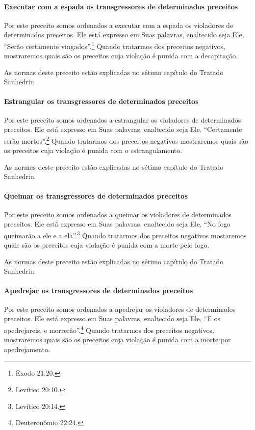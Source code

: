 \begin{multicols}{2}
\paragraph{Executar com a espada os transgressores de determinados preceitos}

Por este preceito somos ordenados a executar com a espada os violadores
de determinados preceitos. Ele está expresso em Suas palavras,
enaltecido seja Ele, ``Serão certamente vingados''.\footnote{Êxodo 21:20.}
Quando tratarmos dos preceitos negativos, mostraremos quais são os
preceitos cuja violação é punida com a decapitação.

As normas deste preceito estão explicadas no sétimo capítulo do Tratado
Sanhedrin\starr.

\paragraph{Estrangular os transgressores de determinados preceitos}

Por este preceito somos ordenados a estrangular os violadores de
determinados preceitos. Ele está expresso em Suas palavras, enaltecido
seja Ele, ``Certamente serão mortos''.\footnote{Levítico 20:10.} Quando tratarmos
dos preceitos negativos mostraremos quais são os preceitos cuja violação
é punida com o estrangulamento.

As normas deste preceito estão explicadas no sétimo capítulo do Tratado
Sanhedrin\starr.

\paragraph{Queimar os transgressores de determinados preceitos}

Por este preceito somos ordenados a queimar os violadores de
determinados preceitos. Ele está expresso em Suas palavras, enaltecido
seja Ele, ``No fogo queimarão a ele e a ela''.\footnote{Levítico 20:14.} Quando
tratarmos dos preceitos negativos mostaremos quais são os preceitos
cuja violação é punida com a morte pelo fogo.

As normas deste preceito estão explicadas no sétimo capítulo do Tratado
Sanhedrin\starr.

\paragraph{Apedrejar os transgressores de determinados preceitos}

Por este preceito somos ordenados a apedrejar os violadores de
determinados preceitos. Ele está expresso em Suas palavras, enaltecido
seja Ele, ``E os apedrejareis, e morrerão''.\footnote{Deuteronômio 22:24.} Quando
tratarmos dos preceitos negativos, mostraremos quais são os preceitos
cuja violação é punida com a morte por apedrejamento.


\end{multicols}
